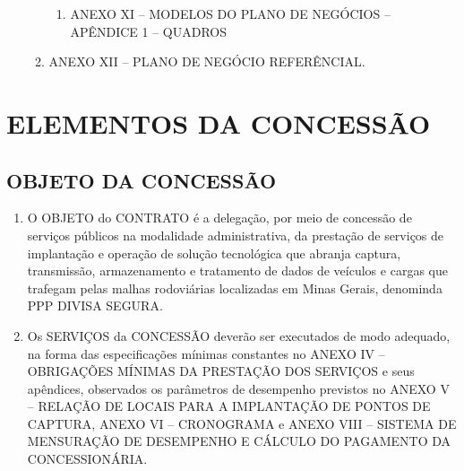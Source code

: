 \documentclass[a4paper,11pt]{report} %
\begin{document}
\begin{enumerate}
\begin{enumerate}[label*=\arabic*.]
\begin{enumerate}[label*=\arabic*.]
\item \label{itm:KBEF} ANEXO XI – MODELOS DO PLANO DE NEGÓCIOS – APÊNDICE 1 – QUADROS 
\end{enumerate}

\item \label{itm:J2UR} ANEXO XII – PLANO DE NEGÓCIO REFERÊNCIAL.

\end{enumerate}
\end{enumerate}

\chapter{ELEMENTOS DA CONCESSÃO}

\section{OBJETO DA CONCESSÃO}
\label{sec:5MSZ}
\begin{enumerate}

\item \label{itm:9REB} O OBJETO do CONTRATO é a delegação, por meio de concessão de serviços públicos na modalidade administrativa, da prestação de serviços de implantação e operação de solução tecnológica que abranja captura, transmissão, armazenamento e tratamento de dados de veículos e cargas que trafegam pelas malhas rodoviárias localizadas em Minas Gerais, denominda PPP DIVISA SEGURA. 

\item \label{itm:8EP5} Os SERVIÇOS da CONCESSÃO deverão ser executados de modo adequado, na forma das especificações mínimas constantes no ANEXO IV – OBRIGAÇÕES MÍNIMAS DA PRESTAÇÃO DOS SERVIÇOS e seus apêndices, observados os parâmetros de desempenho previstos no ANEXO V – RELAÇÃO DE LOCAIS PARA A IMPLANTAÇÃO DE PONTOS DE CAPTURA, ANEXO VI – CRONOGRAMA e ANEXO VIII – SISTEMA DE MENSURAÇÃO DE DESEMPENHO E CÁLCULO DO PAGAMENTO DA CONCESSIONÁRIA.

\end{enumerate}
\end{document}
